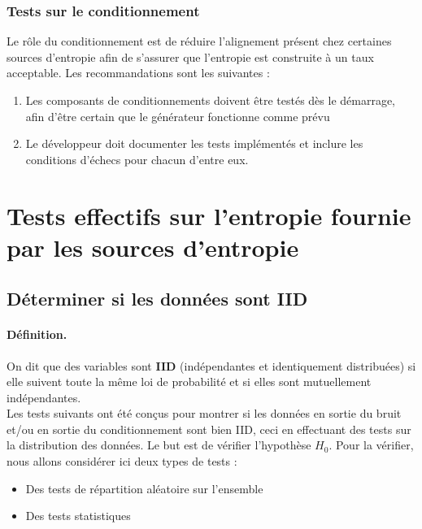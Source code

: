 \subsubsection{Tests sur le conditionnement}
Le rôle du conditionnement est de réduire l'alignement  présent chez certaines sources d'entropie afin de s'assurer que l'entropie est construite à un taux acceptable. Les recommandations sont les suivantes :
\begin{enumerate}
\item Les composants de conditionnements doivent être testés dès le démarrage, afin d'être certain que le générateur fonctionne comme prévu
\item Le développeur doit documenter les tests implémentés et inclure les conditions d'échecs pour chacun d'entre eux.
\end{enumerate}



\section{Tests effectifs sur l'entropie fournie par les sources d'entropie}

\subsection{Déterminer si les données sont IID}

\paragraph{Définition.\\}
On dit que des variables sont \textbf{IID} (indépendantes et identiquement distribuées) si elle suivent toute la même loi de probabilité et si elles sont mutuellement indépendantes. \\

Les tests suivants ont été conçus pour montrer si les données en sortie du bruit et/ou en sortie du conditionnement sont bien IID, ceci en effectuant des tests sur la distribution des données. Le but est de vérifier l'hypothèse $H_0$. Pour la vérifier, nous allons considérer ici deux types de tests : 
\begin{itemize}
\item Des tests de répartition aléatoire sur l'ensemble
\item Des tests statistiques\\
\end{itemize}

